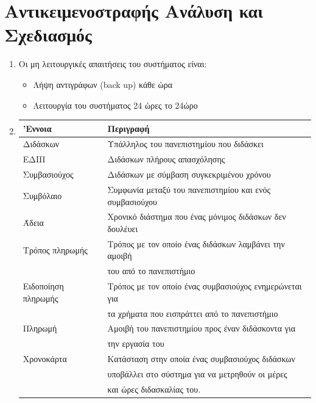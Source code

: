 \documentclass[12pt]{article}
\begin{document}
\section{Αντικειμενοστραφής Ανάλυση και Σχεδιασμός}
\begin{enumerate}
\item
Οι μη λειτουργικές απαιτήσεις του συστήματος είναι:
\begin{itemize}
\item
Λήψη αντιγράφων (\textlatin{back up}) κάθε ώρα
\item
Λειτουργία του συστήματος 24 ώρες το 24ώρο
\end{itemize}
\item
\begin{tabular}{|l|l|}
\hline
'Εννοια & Περιγραφή \\
\hline
Διδάσκων & Υπάλληλος του πανεπιστημίου που διδάσκει \\
\hline
ΕΔΙΠ & Διδάσκων πλήρους απασχόλησης \\
\hline
Συμβασιούχος & Διδάσκων με σύμβαση συγκεκριμένου χρόνου \\
\hline
Συμβόλαιο & Συμφωνία μεταξύ του πανεπιστημίου και ενός συμβασιούχου \\
\hline
Άδεια & Χρονικό διάστημα που ένας μόνιμος διδάσκων δεν δουλέυει \\ 
\hline
Τρόπος πληρωμής & Τρόπος με τον οποίο ένας διδάσκων λαμβάνει την αμοιβή \\ 
& του από το πανεπιστήμιο \\
\hline
Ειδοποίηση πληρωμής & Τρόπος με τον οποίο ένας συμβασιούχος ενημερώνεται για \\
 & τα χρήματα που εισπράττει από το πανεπιστήμιο \\
\hline
Πληρωμή & Αμοιβή του πανεπιστημίου προς έναν διδάσκοντα για \\ 
& την εργασία του \\ 
\hline
Χρονοκάρτα & Κατάσταση στην οποία ένας συμβασιούχος διδάσκων \\
 & υποβάλλει στο σύστημα για να μετρηθούν οι μέρες \\
 &  και ώρες διδασκαλίας του. \\
\hline
\end{tabular}


\end{enumerate}
\end{document}
